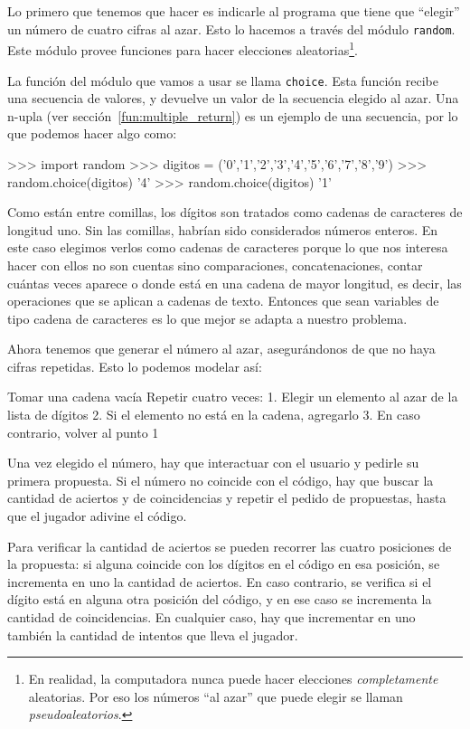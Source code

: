 \begin{enumerate}
Lo primero que tenemos que hacer es indicarle al programa que tiene que
\enquote{elegir} un número de cuatro cifras al azar. Esto lo hacemos a través del
módulo \lstinline!random!. Este módulo provee funciones para hacer elecciones
aleatorias\footnote{En realidad, la computadora nunca puede hacer
elecciones \emph{completamente} aleatorias. Por eso los números \enquote{al azar}
que puede elegir se llaman \emph{pseudoaleatorios}.}.

La función del módulo que vamos a usar se llama \lstinline!choice!. Esta función
recibe una secuencia de valores, y devuelve un valor de la secuencia elegido al
azar. Una n-upla\label{mastermind} (ver sección~\ref{fun:multiple_return}) es un ejemplo de una
secuencia, por lo que podemos hacer algo como:

\begin{codigo-python-sn}
>>> import random
>>> digitos = ('0','1','2','3','4','5','6','7','8','9')
>>> random.choice(digitos)
'4'
>>> random.choice(digitos)
'1'
\end{codigo-python-sn}

Como están entre comillas, los dígitos son tratados como cadenas de caracteres
de longitud uno. Sin las comillas, habrían sido considerados números enteros. En
este caso elegimos verlos como cadenas de caracteres porque lo que nos interesa
hacer con ellos no son cuentas sino comparaciones, concatenaciones, contar
cuántas veces aparece o donde está en una cadena de mayor longitud, es decir,
las operaciones que se aplican a cadenas de texto. Entonces que sean
variables de tipo cadena de caracteres es lo que mejor se adapta a nuestro
problema.

Ahora tenemos que generar el número al azar, asegurándonos de que no haya cifras
repetidas. Esto lo podemos modelar así:

\begin{codigo-nohl-sn}
Tomar una cadena vacía
Repetir cuatro veces:
    1. Elegir un elemento al azar de la lista de dígitos
    2. Si el elemento no está en la cadena, agregarlo
    3. En caso contrario, volver al punto 1
\end{codigo-nohl-sn}

Una vez elegido el número, hay que interactuar con el usuario y pedirle su
primera propuesta. Si el número no coincide con el código, hay que buscar la
cantidad de aciertos y de coincidencias y repetir el pedido de propuestas, hasta
que el jugador adivine el código.

Para verificar la cantidad de aciertos se pueden recorrer las cuatro posiciones
de la propuesta: si alguna coincide con los dígitos en el código en esa
posición, se incrementa en uno la cantidad de aciertos. En caso contrario, se
verifica si el dígito está en alguna otra posición del código, y en ese caso se
incrementa la cantidad de coincidencias. En cualquier caso, hay que incrementar
en uno también la cantidad de intentos que lleva el jugador.


\end{enumerate}
